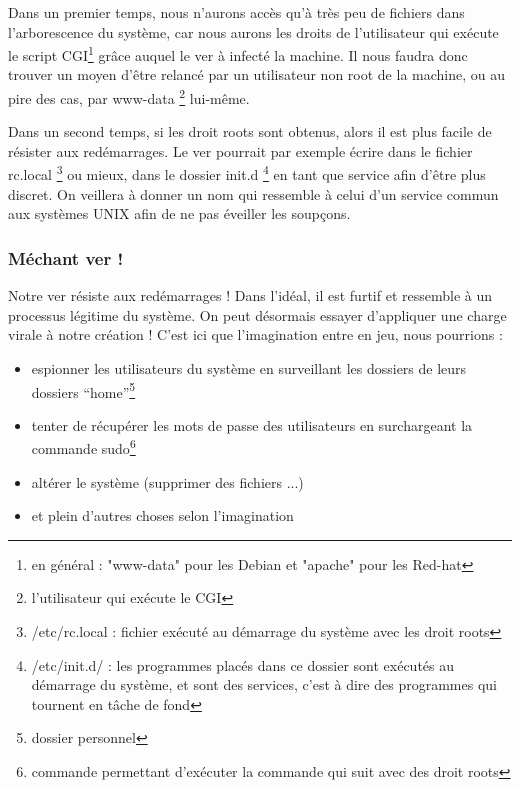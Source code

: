 \documentclass[]{projet-M1}
\begin{document}
Dans un premier temps, nous n'aurons accès qu'à très peu de fichiers dans l'arborescence du système, car nous aurons les droits de l'utilisateur qui exécute le script \gls{CGI}\footnote{en général : "www-data" pour les Debian et "apache" pour les Red-hat} grâce auquel le ver à infecté la machine. Il nous faudra donc trouver un moyen d’être relancé par un utilisateur non root de la machine, ou au pire des cas, par www-data \footnote{l'utilisateur qui exécute le \gls{CGI}} lui-même. 

Dans un second temps, si les \glspl{droit root} sont obtenus, alors il est plus facile de résister aux redémarrages. Le ver pourrait par exemple écrire dans le fichier rc.local \footnote{/etc/rc.local : fichier exécuté au démarrage du système avec les \glspl{droit root}} ou mieux, dans le dossier init.d \footnote{/etc/init.d/ : les programmes placés dans ce dossier sont exécutés au démarrage du système, et sont des services, c'est à dire des programmes qui tournent en tâche de fond} en tant que service afin d'être plus discret. On veillera à donner un nom qui ressemble à celui d'un service commun aux systèmes \gls{UNIX} afin de ne pas éveiller les soupçons.

\subsubsection{Méchant ver !}
Notre ver résiste aux redémarrages ! Dans l'idéal, il est furtif et ressemble à un processus légitime du système. On peut désormais essayer d'appliquer une \gls{charge virale} à notre création ! 
C'est ici que l'imagination entre en jeu, nous pourrions : 
\begin{itemize}
\item espionner les utilisateurs du système en surveillant les dossiers de leurs dossiers ``home''\footnote{dossier personnel}
\item tenter de récupérer les mots de passe des utilisateurs en surchargeant la commande sudo\footnote{commande permettant d'exécuter la commande qui suit avec des \glspl{droit root}}
\item altérer le système (supprimer des fichiers ...)
\item et plein d'autres choses selon l'imagination
\end{itemize}
\end{document}
